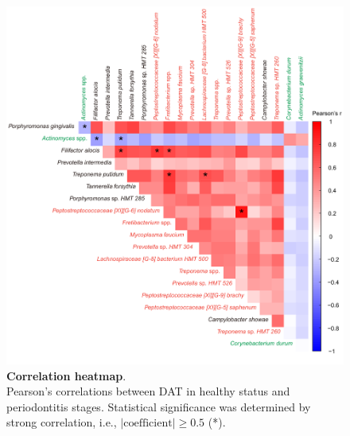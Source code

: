 \documentclass[11pt, a4paper, onecolumn, oneside]{report}
\begin{document}
            \begin{figure}[p]
                \centering
                \includegraphics[width=\linewidth]{Figures/Periodontitis/Figure_3.pdf}
                \caption[Correlation heatmap]{\textbf{Correlation heatmap}. \\
                    Pearson's correlations between DAT in healthy status and periodontitis stages. Statistical significance was determined by strong correlation, i.e., $| \textrm{coefficient} | \ge 0.5$ (*).}
                \label{fig:Periodontitis-correlation}
            \end{figure}
            \clearpage
\end{document}
